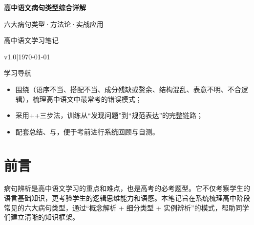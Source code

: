 \documentclass[a4paper,12pt]{ctexrep}
\renewcommand{\notetitle}{高中语文病句类型综合详解}
\renewcommand{\noteauthor}{高中语文学习笔记}
\renewcommand{\notedate}{\today}
\renewcommand{\notesubtitle}{六大病句类型·方法论·实战应用}
\renewcommand{\noteversion}{v1.0}
\begin{document}
\thispagestyle{empty}
\setcounter{page}{1}


\noindent
\begin{minipage}[t][0.7\textheight][c]{\textwidth}
  \raggedleft
  \vspace*{\fill}
  {\sffamily\bfseries\Huge\color{accent}\notetitle\par}
  \vspace{0.6em}
  {\Large\color{inkgray}\notesubtitle\par}
  \vspace{0.5em}
  {\large\color{inkgray}\noteauthor\par}
  \vspace{0.4em}
  {\normalsize\color{inkgray}\noteversion\quad|\quad\notedate\par}
  \vspace*{\fill}
\end{minipage}

\begin{center}
\begin{minipage}{0.84\textwidth}
  \textcolor{inkgray}{\sffamily\small 学习导航}\\
  \begin{itemize}
    \item 围绕（语序不当、搭配不当、成分残缺或赘余、结构混乱、表意不明、不合逻辑），梳理高中语文中最常考的错误模式；
    \item 采用++三步法，训练从“发现问题”到“规范表达”的完整链路；
    \item 配套总结、与，便于考前进行系统回顾与自测。
  \end{itemize}
\end{minipage}
\end{center}
\vspace{1em}

\clearpage
\thispagestyle{plain}

\tableofcontents
\newpage

\chapter*{\heiti 前言}

病句辨析是高中语文学习的重点和难点，也是高考的必考题型。它不仅考察学生的语言基础知识，更考验学生的逻辑思维能力和语感。本笔记旨在系统梳理高中阶段常见的六大病句类型，通过“概念解析 + 细分类型 + 实例辨析”的模式，帮助同学们建立清晰的知识框架。
\end{document}
